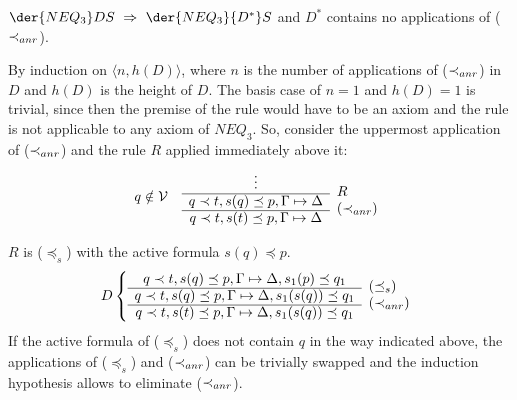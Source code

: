 \begin{LEMMA}\label{le:noar} $\der{NEQ_3}DS\ \impl\ \der{NEQ_3}{D^*}S$
and $D^*$ contains no applications of ($\mathbin{\prec}_{anr}$).
\end{LEMMA}
\begin{PROOF}
By induction on $\langle n,h(D)\rangle$, where $n$ is the number of
applications of ($\mathbin{\prec}_{anr}$) in $D$ and $h(D)$ is the height of $D$. The basis
case of $n=1$ and $h(D)=1$ is trivial, since then the premise of the rule
would have to be an axiom and the rule is not applicable to any axiom of $NEQ_3$.
So, consider the uppermost application of ($\mathbin{\prec}_{anr}$) and the rule $R$ applied
immediately above it:
\[ q\notin \cal V\ \ \ \begin{array}{cl}
  \vdots & \raisebox{-1.2ex}[1.5ex][0ex]{$R$} \\ \cline{1-1}
  q\prec t,s(q)\preceq p,\Gamma\Seq\Delta &
  \raisebox{-1.2ex}[1.5ex][0ex]{($\prec_{anr}$)} \\ \cline{1-1}
  q\prec t,s(t)\preceq p,\Gamma\Seq\Delta &
\end{array} \]
%
\begin{LS}
\item $R$ is ($\preceq_s$) with the active formula $s(q)\preceq p$. 
  \[D \left\{ \begin{array}{cl}
 q\prec t,s(q)\preceq p,\Gamma \Seq \Delta,s_1(p)\preceq q_1  &
  \raisebox{-1.2ex}[1.5ex][0ex]{$(\preceq_s)$} \\ \cline{1-1}
 q\prec t,s(q)\preceq p,\Gamma \Seq \Delta, s_1(s(q))\preceq q_1  &
\raisebox{-1.2ex}[1.5ex][0ex]{$(\prec_{anr})$} \\ \cline{1-1}
 q\prec t,s(t)\preceq p,\Gamma \Seq\Delta, s_1(s(q))\preceq q_1
\end{array} \right. \]
If the active formula of ($\preceq_s$) does not contain $q$ in the way 
indicated above, the applications of ($\preceq_s$) and ($\mathbin{\prec}_{anr}$) can be
trivially swapped and the induction hypothesis allows to eliminate 
($\mathbin{\prec}_{anr}$). 


\end{LS}
\end{PROOF}
